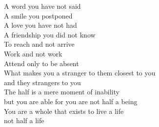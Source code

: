 \begin{Parallel}{0.48\textwidth}{0.48\textwidth}
{A word you have not said\\
A smile you postponed\\
A love you have not had\\
A friendship you did not know\\
To reach and not arrive\\
Work and not work\\
Attend only to be absent\\
What makes you a stranger to them closest to you\\
and they strangers to you\\
The half is a mere moment of inability\\
but you are able for you are not half a being\\
You are a whole that exists to live a life\\
not half a life}
\ParallelPar
\end{Parallel}
\vfill
\hspace{0pt}